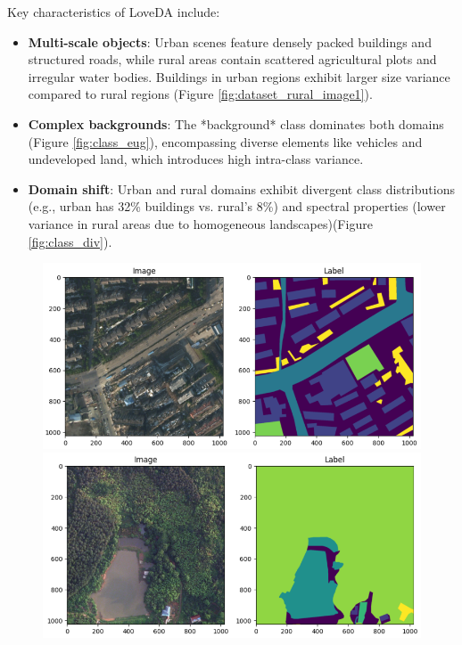 \documentclass{article}
\begin{document}
\begin{multicols}{2}
		Key characteristics of LoveDA include:  
		\begin{itemize}  
			\item \textbf{Multi-scale objects}: Urban scenes feature densely packed buildings and structured roads, while rural areas contain scattered agricultural plots and irregular water bodies. Buildings in urban regions exhibit larger size variance compared to rural regions (Figure \ref{fig:dataset_rural_image1}).  
			\item \textbf{Complex backgrounds}: The *background* class dominates both domains (Figure \ref{fig:class_eug}), encompassing diverse elements like vehicles and undeveloped land, which introduces high intra-class variance.  
			\item \textbf{Domain shift}: Urban and rural domains exhibit divergent class distributions (e.g., urban has 32\% buildings vs. rural’s 8\%) and spectral properties (lower variance in rural areas due to homogeneous landscapes)(Figure \ref{fig:class_div}).  
		\end{itemize}  
		

		\begin{figure}[H]  

			\centering
			\begin{minipage}{1\linewidth}
				\centering
				\includegraphics[width=1\linewidth]{image/urban+mask2.png}
				
			\end{minipage}
			\begin{minipage}{1\linewidth}
				\centering
				\includegraphics[width=1\linewidth]{image/rural+mask5.png}
				

\end{minipage}
\end{figure}
\end{multicols}
\end{document}
